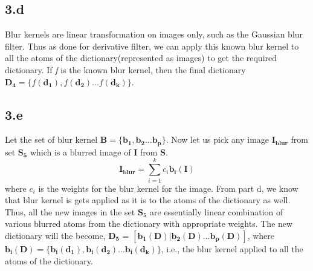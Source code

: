 \documentclass[12pt]{article}
\begin{document}
\subsection*{3.d}
Blur kernels are linear transformation on images only, such as the Gaussian blur filter. Thus as done for derivative filter, we can apply this known blur kernel to all the atoms of the dictionary(represented as images) to get the required dictionary. If \textit{f} is the known blur kernel, then the final dictionary $\boldsymbol{D_4} = \{f(\boldsymbol{d_1}), f(\boldsymbol{d_2})... f(\boldsymbol{d_k})\}$.
\subsection*{3.e}
Let the set of blur kernel $\boldsymbol{B} = \{\boldsymbol{b_1}, \boldsymbol{b_2}... \boldsymbol{b_p}\}$. Now let us pick any image $\boldsymbol{I_{blur}}$ from set $\boldsymbol{S_5}$ which is a blurred image of $\boldsymbol{I}$ from $\boldsymbol{S}$.
\begin{equation*}
    \boldsymbol{I_{blur}} = \sum_{i=1}^{k}c_i\boldsymbol{b_i(I)}
\end{equation*}
where $c_i$ is the weights for the blur kernel for the image. From part d, we know that blur kernel is gets applied as it is to the atoms of the dictionary as well. Thus, all the new images in the set $\boldsymbol{S_5}$ are essentially linear combination of various blurred atoms from the dictionary with appropriate weights. The new dictionary will the become, $\boldsymbol{D_5}$ = $[\boldsymbol{b_1(D)}| \boldsymbol{b_2(D)}... \boldsymbol{b_p(D)}]$, where $\boldsymbol{b_i(D)} = \{\boldsymbol{b_i(d_1)}, \boldsymbol{b_i(d_2)}... \boldsymbol{b_i(d_k)}\}$, i.e., the blur kernel applied to all the atoms of the dictionary.
\end{document}
